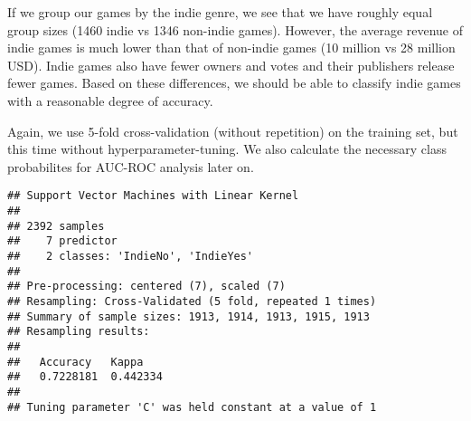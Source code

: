 \documentclass[
]{article}
\newenvironment{Shaded}{\begin{snugshade}}{\end{snugshade}}
\newcommand{\AttributeTok}[1]{\textcolor[rgb]{0.13,0.29,0.53}{#1}}
\newcommand{\DecValTok}[1]{\textcolor[rgb]{0.00,0.00,0.81}{#1}}
\newcommand{\FunctionTok}[1]{\textcolor[rgb]{0.13,0.29,0.53}{\textbf{#1}}}
\newcommand{\NormalTok}[1]{#1}
\newcommand{\OtherTok}[1]{\textcolor[rgb]{0.56,0.35,0.01}{#1}}
\newcommand{\SpecialCharTok}[1]{\textcolor[rgb]{0.81,0.36,0.00}{\textbf{#1}}}
\newcommand{\StringTok}[1]{\textcolor[rgb]{0.31,0.60,0.02}{#1}}
\begin{document}
If we group our games by the indie genre, we see that we have roughly
equal group sizes (1460 indie vs 1346 non-indie games). However, the
average revenue of indie games is much lower than that of non-indie
games (10 million vs 28 million USD). Indie games also have fewer owners
and votes and their publishers release fewer games. Based on these
differences, we should be able to classify indie games with a reasonable
degree of accuracy.

Again, we use 5-fold cross-validation (without repetition) on the
training set, but this time without hyperparameter-tuning. We also
calculate the necessary class probabilites for AUC-ROC analysis later
on.

\begin{Shaded}
\end{Shaded}

\begin{verbatim}
## Support Vector Machines with Linear Kernel 
## 
## 2392 samples
##    7 predictor
##    2 classes: 'IndieNo', 'IndieYes' 
## 
## Pre-processing: centered (7), scaled (7) 
## Resampling: Cross-Validated (5 fold, repeated 1 times) 
## Summary of sample sizes: 1913, 1914, 1913, 1915, 1913 
## Resampling results:
## 
##   Accuracy   Kappa   
##   0.7228181  0.442334
## 
## Tuning parameter 'C' was held constant at a value of 1
\end{verbatim}
\end{document}
